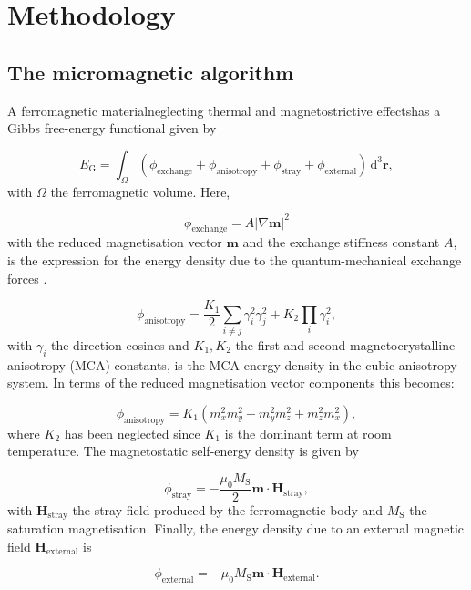 \section{Methodology}
\subsection{The micromagnetic algorithm}
A ferromagnetic material{\textemdash}neglecting thermal and magnetostrictive effects{\textemdash}has a Gibbs free-energy functional given by \citep{Brown}
{\par\nobreak\noindent}
\begin{equation}
E_\text{G} = \int_{\Omega} (\phi_{\text{exchange}} + \phi_{\text{anisotropy}} + \phi_{\text{stray}} + \phi_{\text{external}})\,\text{d}^3 \boldsymbol{r},
\end{equation}
with $\Omega$ the ferromagnetic volume. Here,
{\par\nobreak\noindent}
\begin{equation}
\phi_{\text{exchange}}=A|\nabla\boldsymbol{m}|^2
\end{equation}
 with the reduced magnetisation vector $\boldsymbol{m}$ and the exchange stiffness constant $A$, is the expression for the energy density due to the quantum-mechanical exchange forces \citep{Landau1935}.
{\par\nobreak\noindent}
\begin{equation}
\phi_{\text{anisotropy}}=\frac{K_1}{2}\sum_{i\neq j}\gamma_i^2\gamma_j^2 + K_2\prod_i\gamma_i^2,
\end{equation}
with $\gamma_i$ the direction cosines and $K_1, K_2$ the first and second magnetocrystalline anisotropy (MCA) constants, is the MCA energy density in the cubic anisotropy system. In terms of the reduced magnetisation vector components this becomes:
{\par\nobreak\noindent}
\begin{equation}
\phi_{\text{anisotropy}}=K_1(m_x^2m_y^2+m_y^2m_z^2+m_z^2m_x^2),
\end{equation}
where $K_2$ has been neglected since $K_1$ is the dominant term at room temperature. The magnetostatic self-energy density is given by
{\par\nobreak\noindent}
\begin{equation}
\phi_{\text{stray}}=-\frac{\mu_0M_\text{S}}{2}\boldsymbol{m}\cdot\boldsymbol{H}_{\text{stray}},
\end{equation}
with $\boldsymbol{H}_{\text{stray}}$ the stray field produced by the ferromagnetic body and $M_\text{S}$ the saturation magnetisation. Finally, the energy density due to an external magnetic field $\boldsymbol{H}_{\text{external}}$ is
{\par\nobreak\noindent}
\begin{equation}
\phi_{\text{external}}=-\mu_0M_\text{S}\boldsymbol{m}\cdot\boldsymbol{H}_{\text{external}}.
\end{equation}\par

